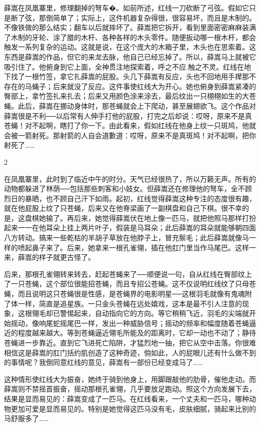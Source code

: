 薛嵩在凤凰寨里，修理翻掉的弩车�。如前所述，红线一刀砍断了弓弦。假如它只是断了弦，那倒简单了；实际上，这件机器复杂得很，很容易坏，而且是木制的。不像铁做的那么结实；翻车以后就摔坏了。薛嵩把它拆开，看到里面密密麻麻装满了木制的牙轮、涂了腊的木杆、各种各样的木头零件。随便扳动哪一根木杆，都会触发一系列复杂的运动。这就是说，在这个庞大的木箱子里，木头也在思索着。这东西是薛嵩的作品，但它的来龙去脉，他自己已经忘掉了。所以，薛嵩马上就被它吸引住了。他俯身到它上面，全神贯注地探索着，呼之不应.触之不灵。红线在地下找了一根竹签，拿它扎薛嵩的屁股。头几下薛嵩有反应，头也不回地用手撵那不存在的马蝇子；后来就没了反应。这件事使红线大为开心。她也俯身到薛嵩紧凑的臀部上，拿竹签扎来扎去；后来又用颜色涂来涂去，最后纹出一只栩栩如生的大苍蝇。此后，薛嵩在挪动身体时，那苍蝇就会上下爬动，甚至展翅欲飞。这个作品对薛嵩很是不利──以后常有人伸手打他的屁股，打完之后却说：哎呀，原来不是真苍蝇！对不起啊，瞎打了你一下。由此看来，假如红线在他身上纹一只斑鸠，他就会被一箭射死。那射箭的人自会道歉道：哎呀，原来不是真斑鸠！对不起啊，把你射死了…… 

2 

在凤凰寨里，此时到了临近中午的时分。天气已经很热了，所以万籁无声。所有的动物都躲进了林荫──包括那些刺客和小妓女。但薛嵩还在修理他的弩车，全不顾烈日的暴晒，也不顾自己汗下如雨。起初，红线觉得薛嵩这种专注的态度很有趣，就在他屁股上纹了只苍蝇，后来又在他脊梁画了一副棋盘和自己下棋。很不幸的是，这盘棋她输了。再后来，她觉得薛嵩伏在地上像一匹马，就把他照马那样打扮起来一一在他耳朵上挂上两片叶子，假装是马耳朵；此后薛嵩的耳朵就能够朝四面八方转动。搞来一些乾枯的羊胡子草放在他脖子上，冒充鬃毛；此后薛嵩就像马一样的喷起鼻子来了。后来，她拿来一根孔雀翎，插在他肛门里当作马尾巴。这样一来，薛嵩的样子就更古怪了。 

后来，那根孔雀翎转来转去，赶起苍蝇来了──顺便说一句，自从红线在臀部纹上了一只苍蝇，这个部位很能招苍蝇，而且专招公苍蝇。这不仅说明红线纹了只母苍蝇，而且说明这只苍蝇很是性感，是苍蝇界的电影明星──这根羽毛就像有鬼魂附了体一样，简直是追星族。一只金头苍蝇在远处嬉戏，这本是最不引人注意的现象，这根翎毛却已警惕起来，自动指向它的方向。等它稍稍飞近，羽毛的尖端就开始摇动，像响尾蛇摇尾巴一样，发出一种威胁信号；摇动的频率和幅度随着苍蝇逼近的程度越来越大。等到苍蝇逼近翎毛所能及的距离时，它却一动也不动了；静待苍蝇进一步靠近。直到它飞进死亡陷阱，才猛烈地一抽，把它从空中击落。你很难相信这是薛嵩的肛门括约肌创造了这种奇迹，倘如此，人的屁眼儿还有什么做不到的事情呢？我倒同意红线的意见，薛嵩有一部份已经变成马了…… 

这种情形使红线大为振奋，她终于骑到他身上，用脚跟敲他的肋骨，催他走动。而薛嵩则不禁摇首振奋，摇动那根孔雀翎，几乎要放足跑动。照这个方向发展下去，结果是显而易见的：薛嵩变成了一匹马。在红线看来，一个丈夫和一匹马，哪种动物更加可爱是显而易见的。特别是她觉得这匹马没有毛，皮肤细腻，骑起来比别的马舒服多了…… 

